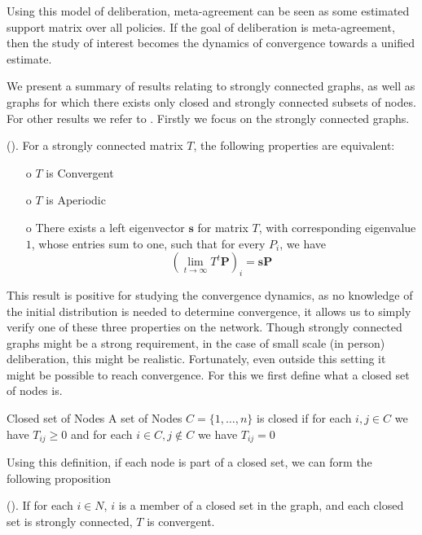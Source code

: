 Using this model of deliberation, meta-agreement can be seen as some estimated support matrix over all policies. If the goal of deliberation is meta-agreement, then the study of interest becomes the dynamics of convergence towards a unified estimate.

We present a summary of results relating to strongly connected graphs, as well as graphs for which there exists only closed and strongly connected subsets of nodes. For other results we refer to \citet{golubNaiveLearningSocial2010}. Firstly we focus on the strongly connected graphs.

\begin{proposition}{(\citet{golubNaiveLearningSocial2010}).}
	For a strongly connected matrix \(T\), the following properties are equivalent:
	\begin{itemize}
		\item[o] \(T\) is Convergent
		\item[o] \(T\) is Aperiodic
		\item[o] There exists a left eigenvector \(\boldsymbol{s}\) for matrix \(T\), with corresponding eigenvalue \(1\), whose entries sum to one, such that for every $P_i$, we have
			\[\left(\lim_{t\to \infty}T^{t} \boldsymbol{P}\right)_{i} = \boldsymbol{s}\boldsymbol{P}\]
	\end{itemize}
\end{proposition}

This result is positive for studying the convergence dynamics, as no knowledge of the initial distribution is needed to determine convergence, it allows us to simply verify one of these three properties on the network. Though strongly connected graphs might be a strong requirement, in the case of small scale (in person) deliberation, this might be realistic. Fortunately, even outside this setting it might be possible to reach convergence. For this we first define what a closed set of nodes is.

\begin{definition}{Closed set of Nodes}{}
	A set of Nodes \(C = \{1, \dots, n\}\) is closed if for each \(i,j \in C\) we have $T_{ij} \geq 0$ and for each \(i \in C, j \notin C\) we have \(T_{ij} = 0\)
\end{definition}

Using this definition, if each node is part of a closed set, we can form the following proposition

\begin{proposition}{(\citet{golubNaiveLearningSocial2010}).}
	If for each \(i \in N\), \(i\) is a member of a closed set in the graph, and each closed set is strongly connected, \(T\) is convergent.
\end{proposition}

